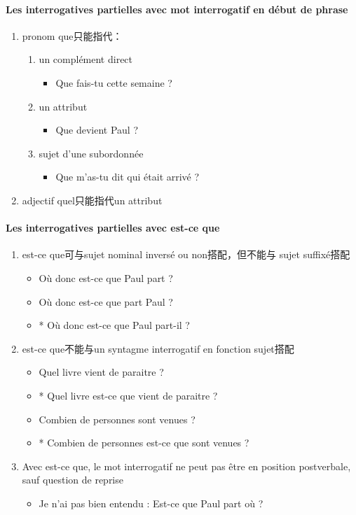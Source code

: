 \documentclass[UTF8]{report}
\begin{document}
\paragraph{Les interrogatives partielles avec mot interrogatif en début de phrase}
\begin{enumerate}
    \item pronom que只能指代：
    \begin{enumerate}
        \item un complément direct
        \begin{itemize}
            \item Que fais-tu cette semaine ?
        \end{itemize}
        \item un attribut
        \begin{itemize}
            \item Que devient Paul ?
        \end{itemize}
        \item sujet d’une subordonnée
        \begin{itemize}
            \item Que m’as-tu dit qui était arrivé ?
        \end{itemize}
    \end{enumerate}
    \item adjectif quel只能指代un attribut
\end{enumerate}


\paragraph{Les interrogatives partielles avec est-ce que}
\begin{enumerate}
    \item est-ce que可与sujet nominal inversé ou non搭配，但不能与 sujet suffixé搭配
    \begin{itemize}
        \item Où donc est-ce que Paul part ?
        \item Où donc est-ce que part Paul ?
        \item * Où donc est-ce que Paul part-il ?
    \end{itemize}
    \item est-ce que不能与un syntagme interrogatif en fonction sujet搭配
    \begin{itemize}
        \item Quel livre vient de paraitre ?
        \item * Quel livre est-ce que vient de paraitre ?
        \item Combien de personnes sont venues ?
        \item * Combien de personnes est-ce que sont venues ?
    \end{itemize}
    \item Avec est-ce que, le mot interrogatif ne peut pas être en position postverbale, sauf question de reprise
    \begin{itemize}
        \item Je n’ai pas bien entendu : Est-ce que Paul part où ?
    \end{itemize}
\end{enumerate}
\end{document}
